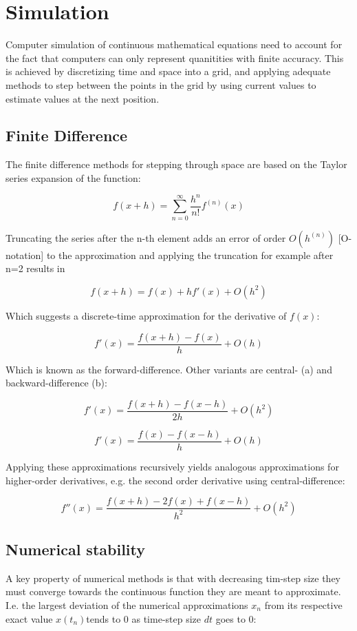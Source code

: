 \documentclass{article}
\begin{document}
\section{Simulation}
Computer simulation of continuous mathematical equations need to account for the fact that computers can only represent quanitities with finite accuracy. This is achieved by discretizing time and space into a grid, and applying adequate methods to step between the points in the grid by using current values to estimate values at the next position.

\subsection{Finite Difference}

The finite difference methods for stepping through space are based on the Taylor series expansion of the function:

$$f(x+h) = \sum_{n=0}^\infty \frac{h^n}{n!}f^{(n)}(x)$$

Truncating the series after the n-th element adds an error of order $O(h^{(n)})$ [O-notation] to the approximation and applying the truncation for example after n=2 results in 

$$f(x+h)=f(x)+hf'(x)+O(h^2)$$

Which suggests a discrete-time approximation for the derivative of $f(x)$:

$$f'(x)=\frac{f(x+h)-f(x)}{h}+O(h)$$

Which is known as the forward-difference. Other variants are central- (a) and backward-difference (b):

$$f'(x)=\frac{f(x+h)-f(x-h)}{2h}+O(h^2)$$

$$f'(x) = \frac{f(x)-f(x-h)}{h}+O(h)$$

Applying these approximations recursively yields analogous approximations for higher-order derivatives, e.g. the second order derivative using central-difference:

$$f''(x)=\frac{f(x+h)-2f(x)+f(x-h)}{h^2}+O(h^2)$$

\pagebreak

\subsection{Numerical stability}

A key property of numerical methods is that with decreasing tim-step size they must converge towards the continuous function they are meant to approximate. I.e. the largest deviation of the numerical approximations $x_n$ from its respective exact value $x(t_n)$tends to 0 as time-step size $dt$ goes to 0:
\end{document}
